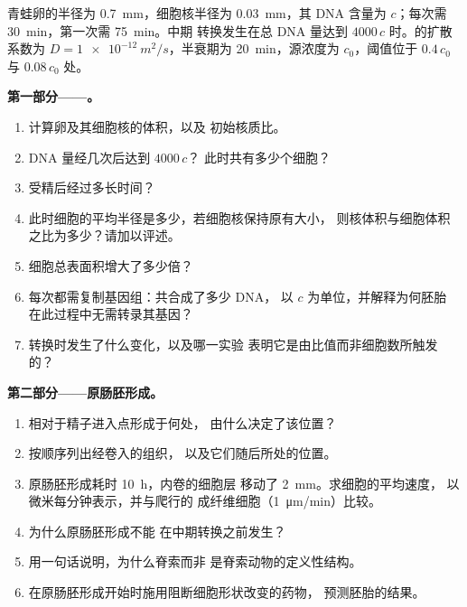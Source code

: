 \begin{problem}
\label{pb:b2:vertebrate-development:1}
青蛙卵的半径为 \qty{0.7}{mm}，细胞核半径为
\qty{0.03}{mm}，其 DNA 含量为 $c$；每次需
\qty{30}{min}，第一次需 \qty{75}{min}。中期
转换发生在总 DNA 量达到 $4000\,c$ 时。的扩散系数为 $D =
\qty{1e-12}{m^2/s}$，半衰期为 \qty{20}{min}，源浓度为
$c_0$，阈值位于 $0.4\,c_0$ 与 $0.08\,c_0$ 处。

\medskip
\noindent\textbf{第一部分——。}
\begin{enumerate}
  \item 计算卵及其细胞核的体积，以及
        初始核质比。
  \item DNA 量经几次后达到 $4000\,c$？
        此时共有多少个细胞？
  \item 受精后经过多长时间？
  \item 此时细胞的平均半径是多少，若细胞核保持原有大小，
        则核体积与细胞体积之比为多少？请加以评述。
  \item 细胞总表面积增大了多少倍？
  \item 每次都需复制基因组：共合成了多少 DNA，
        以 $c$ 为单位，并解释为何胚胎
        在此过程中无需转录其基因？
  \item 转换时发生了什么变化，以及哪一实验
        表明它是由比值而非细胞数所触发的？
\end{enumerate}

\medskip
\noindent\textbf{第二部分——原肠胚形成。}
\begin{enumerate}[resume]
  \item {}相对于精子进入点形成于何处，
        由什么决定了该位置？
  \item 按顺序列出经卷入的组织，
        以及它们随后所处的位置。
  \item 原肠胚形成耗时 \qty{10}{h}，内卷的细胞层
        移动了 \qty{2}{mm}。求细胞的平均速度，
        以微米每分钟表示，并与爬行的
        成纤维细胞（\qty{1}{\micro m/min}）比较。
  \item 为什么原肠胚形成不能
        在中期转换之前发生？
  \item 用一句话说明，为什么脊索而非
        是脊索动物的定义性结构。
  \item 在原肠胚形成开始时施用阻断细胞形状改变的药物，
        预测胚胎的结果。
\end{enumerate}


\end{problem}
